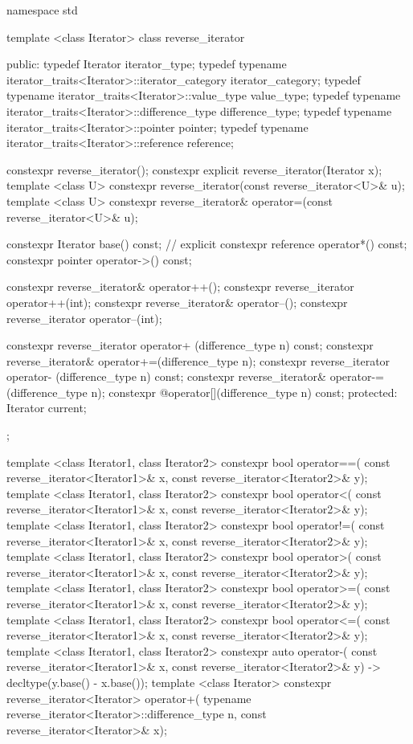 %
\begin{codeblock}
namespace std {
  template <class Iterator>
  class reverse_iterator {
  public:
    typedef Iterator                                              iterator_type;
    typedef typename iterator_traits<Iterator>::iterator_category iterator_category;
    typedef typename iterator_traits<Iterator>::value_type        value_type;
    typedef typename iterator_traits<Iterator>::difference_type   difference_type;
    typedef typename iterator_traits<Iterator>::pointer           pointer;
    typedef typename iterator_traits<Iterator>::reference         reference;

    constexpr reverse_iterator();
    constexpr explicit reverse_iterator(Iterator x);
    template <class U> constexpr reverse_iterator(const reverse_iterator<U>& u);
    template <class U> constexpr reverse_iterator& operator=(const reverse_iterator<U>& u);

    constexpr Iterator base() const;      // explicit
    constexpr reference operator*() const;
    constexpr pointer   operator->() const;

    constexpr reverse_iterator& operator++();
    constexpr reverse_iterator  operator++(int);
    constexpr reverse_iterator& operator--();
    constexpr reverse_iterator  operator--(int);

    constexpr reverse_iterator  operator+ (difference_type n) const;
    constexpr reverse_iterator& operator+=(difference_type n);
    constexpr reverse_iterator  operator- (difference_type n) const;
    constexpr reverse_iterator& operator-=(difference_type n);
    constexpr @\unspec@ operator[](difference_type n) const;
  protected:
    Iterator current;
  };

  template <class Iterator1, class Iterator2>
    constexpr bool operator==(
      const reverse_iterator<Iterator1>& x,
      const reverse_iterator<Iterator2>& y);
  template <class Iterator1, class Iterator2>
    constexpr bool operator<(
      const reverse_iterator<Iterator1>& x,
      const reverse_iterator<Iterator2>& y);
  template <class Iterator1, class Iterator2>
    constexpr bool operator!=(
      const reverse_iterator<Iterator1>& x,
      const reverse_iterator<Iterator2>& y);
  template <class Iterator1, class Iterator2>
    constexpr bool operator>(
      const reverse_iterator<Iterator1>& x,
      const reverse_iterator<Iterator2>& y);
  template <class Iterator1, class Iterator2>
    constexpr bool operator>=(
      const reverse_iterator<Iterator1>& x,
      const reverse_iterator<Iterator2>& y);
  template <class Iterator1, class Iterator2>
    constexpr bool operator<=(
      const reverse_iterator<Iterator1>& x,
      const reverse_iterator<Iterator2>& y);
  template <class Iterator1, class Iterator2>
    constexpr auto operator-(
      const reverse_iterator<Iterator1>& x,
      const reverse_iterator<Iterator2>& y) -> decltype(y.base() - x.base());
  template <class Iterator>
    constexpr reverse_iterator<Iterator> operator+(
      typename reverse_iterator<Iterator>::difference_type n,
      const reverse_iterator<Iterator>& x);

}
\end{codeblock}
